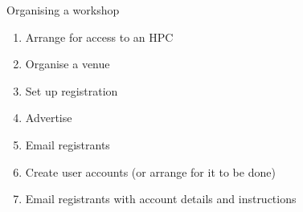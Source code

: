 \begin{frame}{Organising a workshop}
	\begin{enumerate}
		\item Arrange for access to an HPC
		\item Organise a venue
		\item Set up registration
		\item Advertise
		\item Email registrants
		\item Create user accounts (or arrange for it to be done)
		\item Email registrants with account details and instructions
	\end{enumerate}
\end{frame}